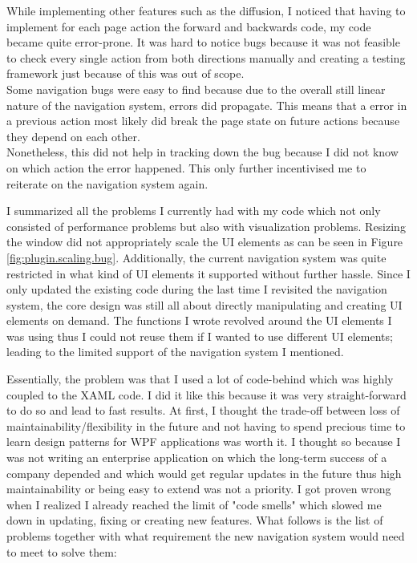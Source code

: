 While implementing other features such as the diffusion, I noticed that having to implement for each page action the forward and backwards code, my code became quite error-prone. It was hard to notice bugs because it was not feasible to check every single action from both directions manually and creating a testing framework just because of this was out of scope. \\
Some navigation bugs were easy to find because due to the overall still linear nature of the navigation system, errors did propagate. This means that a error in a previous action most likely did break the page state on future actions because they depend on each other. \\
Nonetheless, this did not help in tracking down the bug because I did not know on which action the error happened. This only further incentivised me to reiterate on the navigation system again.

I summarized all the problems I currently had with my code which not only consisted of performance problems but also with visualization problems. Resizing the window did not appropriately scale the UI elements as can be seen in Figure \ref{fig:plugin.scaling.bug}. Additionally, the current navigation system was quite restricted in what kind of UI elements it supported without further hassle. Since I only updated the existing code during the last time I revisited the navigation system, the core design was still all about directly manipulating and creating UI elements on demand. The functions I wrote revolved around the UI elements I was using thus I could not reuse them if I wanted to use different UI elements; leading to the limited support of the navigation system I mentioned.

Essentially, the problem was that I used a lot of code-behind which was highly coupled to the XAML code. I did it like this because it was very straight-forward to do so and lead to fast results. At first, I thought the trade-off between loss of maintainability/flexibility in the future and not having to spend precious time to learn design patterns for WPF applications was worth it. I thought so because I was not writing an enterprise application on which the long-term success of a company depended and which would get regular updates in the future thus high maintainability or being easy to extend was not a priority. I got proven wrong when I realized I already reached the limit of "code smells" which slowed me down in updating, fixing or creating new features. What follows is the list of problems together with what requirement the new navigation system would need to meet to solve them:

